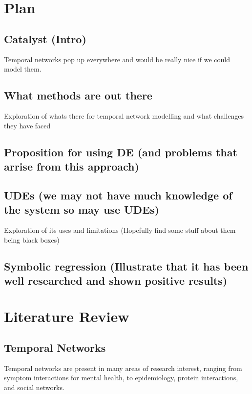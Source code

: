 \documentclass[12pt]{amsart}
\begin{document}
    
\section{Plan}
    \subsection{Catalyst (Intro)}
        Temporal networks pop up everywhere and would be really nice if we could model them.


    \subsection{What methods are out there}
        Exploration of whats there for temporal network modelling and what challenges they have faced



    
    \subsection{Proposition for using DE (and problems that arrise from this approach)}



    \subsection{UDEs (we may not have much knowledge of the system so may use UDEs)}
        Exploration of its uses and limitations
        (Hopefully find some stuff about them being black boxes)

    \subsection{Symbolic regression (Illustrate that it has been well researched and shown positive results)}

    

\section{Literature Review}

\subsection{Temporal Networks}
    Temporal networks are present in many areas of research interest, ranging from symptom interactions for mental health\cite{jordan2020current,contreras2020temporal}, to epidemiology\cite{masuda2013predicting}, protein interactions\cite{lucas2021inferring,jin2009identifying}, and social networks\cite{moinet2015burstiness,hanneke2010discrete}. 
    
\end{document}
